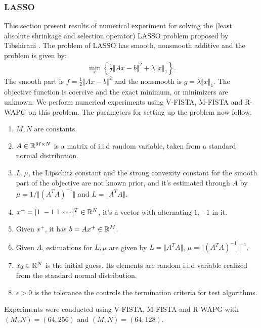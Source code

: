 \documentclass[12pt]{article}
\begin{document}
    \subsubsection{LASSO}
        This section present results of numerical experiment for solving the (least absolute shrinkage and
        selection operator) LASSO problem proposed by 
        Tibshirani \cite{tibshirani_regression_1996}. 
        The problem of LASSO has smooth, nonsmooth additive and the problem is given by: 
        \begin{align*}
            \min_x
            \left\lbrace
                \frac{1}{2}\Vert Ax - b\Vert^2 + \lambda\Vert x\Vert_1
            \right\rbrace. 
        \end{align*}
        The smooth part is $f =\frac{1}{2}\Vert Ax - b\Vert^2$ and the nonsmooth is $g = \lambda\Vert x\Vert_1$. 
        The objective function is coercive and the exact minimum, or minimizers are unknown. 
        We perform numerical experiments using V-FISTA, M-FISTA and R-WAPG on this problem. 
        The parameters for setting up the problem now follow. 
        \begin{enumerate}
            \item $M, N$ are constants. 
            \item $A \in \mathbb R^{M\times N}$ is a matrix of i.i.d random variable, taken from a standard normal distribution. 
            \item $L, \mu$, the Lipschitz constant and the strong convexity constant for the smooth part of the objective are not known prior, and it's estimated through $A$ by $\mu = 1/\Vert (A^TA)^{-1}\Vert$ and $L = \Vert A^TA\Vert$. 
            \item $x^+ = [1\; -1\; 1 \; \cdots ]^T \in \mathbb R^N$, it's a vector with alternating $1, -1$ in it. 
            \item Given $x^+$, it has $b = Ax^+ \in \mathbb R^M$. 
            \item Given $A$, estimations for $L,\mu$ are given by $L = \Vert A^TA\Vert$, $\mu = \Vert (A^TA)^{-1}\Vert^{-1}$. 
            \item $x_0\in \mathbb R^N$ is the initial guess. Its elements are random i.i.d variable realized from the standard normal distribution. 
            \item $\epsilon > 0$ is the tolerance the controls the termination criteria for test algorithms. 
        \end{enumerate}
        Experiments were conducted using V-FISTA, M-FISTA and R-WAPG with $(M, N) = (64, 256)$ and $(M, N) = (64, 128)$. 
\end{document}
